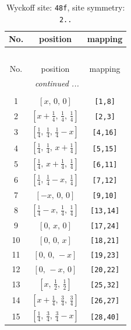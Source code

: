 \documentclass[fleqn,8pt]{jsarticle}
\begin{document}
\begin{longtable}{ccc}
\caption{Wyckoff site: {\tt 48f}, site symmetry: {\tt 2..}}
 \\
 \hline \hline
No. & position & mapping \\ \hline \endfirsthead

\multicolumn{2}{l}{\tablename\ \thetable{}} \\
 \hline \hline
No. & position & mapping \\ \hline \endhead

 \hline \hline
\multicolumn{2}{r}{\footnotesize\it continued ...} \\ \endfoot

 \hline \hline
\multicolumn{2}{r}{} \\ \endlastfoot

1 & $\left[ x,\, 0,\, 0 \right]$ & {\tt [1,8]} \\ \hline
2 & $\left[ x + \frac{1}{4},\, \frac{1}{4},\, \frac{1}{4} \right]$ & {\tt [2,3]} \\ \hline
3 & $\left[ \frac{1}{4},\, \frac{1}{4},\, \frac{1}{4} - x \right]$ & {\tt [4,16]} \\ \hline
4 & $\left[ \frac{1}{4},\, \frac{1}{4},\, x + \frac{1}{4} \right]$ & {\tt [5,15]} \\ \hline
5 & $\left[ \frac{1}{4},\, x + \frac{1}{4},\, \frac{1}{4} \right]$ & {\tt [6,11]} \\ \hline
6 & $\left[ \frac{1}{4},\, \frac{1}{4} - x,\, \frac{1}{4} \right]$ & {\tt [7,12]} \\ \hline
7 & $\left[ - x,\, 0,\, 0 \right]$ & {\tt [9,10]} \\ \hline
8 & $\left[ \frac{1}{4} - x,\, \frac{1}{4},\, \frac{1}{4} \right]$ & {\tt [13,14]} \\ \hline
9 & $\left[ 0,\, x,\, 0 \right]$ & {\tt [17,24]} \\ \hline
10 & $\left[ 0,\, 0,\, x \right]$ & {\tt [18,21]} \\ \hline
11 & $\left[ 0,\, 0,\, - x \right]$ & {\tt [19,23]} \\ \hline
12 & $\left[ 0,\, - x,\, 0 \right]$ & {\tt [20,22]} \\ \hline
13 & $\left[ x,\, \frac{1}{2},\, \frac{1}{2} \right]$ & {\tt [25,32]} \\ \hline
14 & $\left[ x + \frac{1}{4},\, \frac{3}{4},\, \frac{3}{4} \right]$ & {\tt [26,27]} \\ \hline
15 & $\left[ \frac{1}{4},\, \frac{3}{4},\, \frac{3}{4} - x \right]$ & {\tt [28,40]} \\ \hline

\end{longtable}
\end{document}
